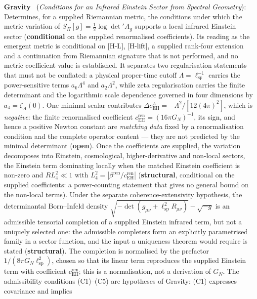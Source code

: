 \documentclass[11pt,a4paper]{article}
\newcommand{\sstruct}{\textcolor{cstruct}{\textbf{structural}}}
\newcommand{\sopen}{\textcolor{copen}{\textbf{open}}}
\newcommand{\scond}{\textcolor{ccond}{\textbf{conditional}}}
\begin{document}
    \textbf{Gravity}~\cite{Beau2026h} (\emph{Conditions for an Infrared Einstein Sector from
    Spectral Geometry}): Determines, for a supplied Riemannian metric, the conditions under which the metric
    variation of $S_\Pi[g] = \tfrac{1}{2}\log\det' A_g$ supports a local infrared Einstein sector (\scond{} on the
    supplied renormalised coefficients). Its reading as the emergent metric is conditional on [H-L], [H-lift], a
    supplied rank-four extension and a continuation from Riemannian signature that is not performed, and no metric
    coefficient value is established. It separates two
    regularisation statements that must not be conflated: a physical proper-time cutoff
    $\Lambda = \ell_{\mathrm{sp}}^{-1}$ carries the power-sensitive terms $a_0\Lambda^4$ and $a_2\Lambda^2$,
    while zeta regularisation carries the finite determinant and the logarithmic scale dependence governed in
    four dimensions by $a_4 = \zeta_A(0)$. One minimal scalar contributes
    $\Delta c_{\mathrm{EH}}^{\Lambda} = -\Lambda^2/[12(4\pi)^2]$, which is \emph{negative}: the finite
    renormalised coefficient $c_{\mathrm{EH}}^{\mathrm{ren}} = (16\pi G_N)^{-1}$, its sign, and hence a positive
    Newton constant are \emph{matching data} fixed by a renormalisation condition and the complete operator
    content — they are not predicted by the minimal determinant (\sopen). Once the coefficients are supplied,
    the variation decomposes into Einstein, cosmological, higher-derivative and non-local sectors, the Einstein
    term dominating locally when the matched Einstein coefficient is non-zero and $R L_4^2 \ll 1$ with
    $L_4^2 = |\beta^{\mathrm{ren}}/c_{\mathrm{EH}}^{\mathrm{ren}}|$ (\sstruct{}, conditional on the supplied
    coefficients: a power-counting statement that gives no general bound on the non-local terms). Under the
    separate coherence-extensivity hypothesis, the
    determinantal Born--Infeld density
    $\sqrt{-\det(g_{\mu\nu}+\ell_{\mathrm{sp}}^2 R_{\mu\nu})}-\sqrt{-g}$ is an admissible tensorial
    completion of a supplied Einstein infrared term, but not a uniquely selected one: the admissible
    completers form an explicitly parametrised family in a sector function, and the input a uniqueness theorem
    would require is stated (\sstruct).
    The completion is normalised by the prefactor $1/(8\pi G_N\ell_{\mathrm{sp}}^2)$, chosen so that its linear term
    reproduces the supplied Einstein term with coefficient $c_{\mathrm{EH}}^{\mathrm{ren}}$; this is a normalisation,
    not a derivation of $G_N$.
    The admissibility conditions (C1)--(C5) are hypotheses of Gravity: (C1) expresses covariance and implies
\end{document}
